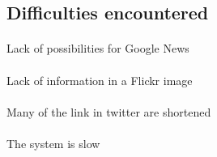 \documentclass[10pt, a4paper]{article}
\begin{document}
\subsection{Difficulties encountered}
\setcounter{secnumdepth}{5}
\paragraph{}Lack of possibilities for Google News
\paragraph{}Lack of information in a Flickr image
\paragraph{}Many of the link in twitter are shortened
\paragraph{}The system is slow


%
%
\end{document}

